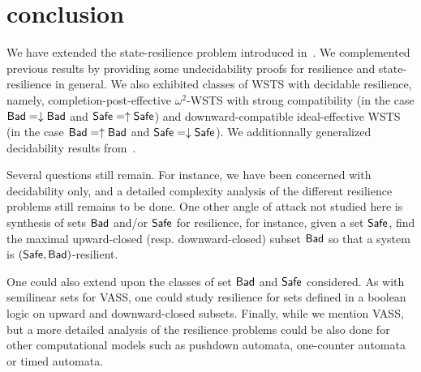 



\section{conclusion}


We have extended the state-resilience problem introduced in~\cite{DBLP:journals/corr/abs-2108-00889,DBLP:conf/gg/Ozkan22}.
We complemented previous results by providing some undecidability proofs for resilience and state-resilience in general. We also exhibited classes of WSTS with decidable resilience, namely, 
completion-post-effective $\omega^2$-WSTS with strong compatibility (in the case $\textsf{Bad} = \downarrow \textsf{Bad}$ and $\textsf{Safe} = \uparrow \textsf{Safe}$) and 
downward-compatible
ideal-effective WSTS
(in the case $\textsf{Bad} = \uparrow \textsf{Bad}$ and $\textsf{Safe} = \downarrow \textsf{Safe}$).
We additionnally generalized decidability results from~\cite{DBLP:journals/corr/abs-2108-00889,DBLP:conf/gg/Ozkan22}.

Several questions still remain.
For instance, we have been concerned with decidability only, and a detailed complexity analysis of the different resilience problems still remains to be done. 
One other angle of attack not studied here is synthesis of sets $\textsf{Bad}$ and/or $\textsf{Safe}$ for resilience,
for instance, given a set $\textsf{Safe}$, find the maximal upward-closed (resp. downward-closed) subset 
$\textsf{Bad}$ so that a system is $(\textsf{Safe},\textsf{Bad})$-resilient. 

One could also extend upon the classes of set $\textsf{Bad}$ and $\textsf{Safe}$ considered. As with semilinear sets for VASS, one could study resilience for sets defined in a boolean logic on upward and downward-closed subsets. Finally, while we mention VASS, but a more detailed analysis of the resilience problems could be also done for other computational models such as pushdown automata, one-counter automata or timed automata.


%
%
%
%


